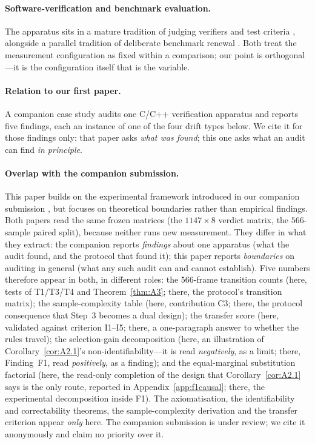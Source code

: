 \documentclass{article}
\begin{document}
\paragraph{Software-verification and benchmark evaluation.} The apparatus sits in a mature tradition of
judging verifiers and test criteria \citep{klein2009sel4,leroy2009compcert,jia2011mutation,just2014mutants,
cadar2008klee,cui2024falsenegatives,li2024ubfuzz,beyer2026svcomp}, alongside a parallel tradition of
deliberate benchmark renewal \citep{kiela2021dynabench,white2024livebench,wang2024benchmarkevolving}. Both
treat the measurement configuration as fixed within a comparison; our point is orthogonal---it is the
configuration itself that is the variable.

\paragraph{Relation to our first paper.} A companion case study \citep{queyi2027caliber} audits one C/C++
verification apparatus and reports five findings, each an instance of one of the four drift types below. We
cite it for those findings only: that paper asks \emph{what was found}; this one asks what an audit can find
\emph{in principle}.

\paragraph{Overlap with the companion submission.} This paper builds on the experimental framework introduced
in our companion submission \citep{queyi2027caliber}, but focuses on theoretical boundaries rather than
empirical findings. Both papers read the same frozen matrices
(the $1147\times8$ verdict matrix, the $566$-sample paired split), because neither runs new measurement.
They differ in what they extract: the companion reports
\emph{findings} about one apparatus (what the audit found, and the protocol that found it);
this paper reports \emph{boundaries} on auditing in general (what any such audit can and
cannot establish). Five numbers therefore appear in both, in different roles: the $566$-frame transition
counts (here, tests of T1/T3/T4 and Theorem~\ref{thm:A3}; there, the protocol's transition matrix);
the sample-complexity table (here, contribution C3; there, the protocol consequence that Step~3
becomes a dual design); the transfer score (here, validated against criterion I1--I5; there, a
one-paragraph answer to whether the rules travel); the selection-gain decomposition
(here, an illustration of Corollary~\ref{cor:A2.1}'s non-identifiability---it is read
\emph{negatively}, as a limit; there, Finding~F1, read \emph{positively}, as a finding); and the
equal-marginal substitution factorial (here, the read-only completion of the design that
Corollary~\ref{cor:A2.1} says is the only route, reported in Appendix~\ref{app:f1causal}; there, the
experimental decomposition inside F1). The
axiomatisation, the identifiability and correctability theorems, the sample-complexity derivation and
the transfer criterion appear \emph{only} here. The companion submission is under review; we cite it
anonymously and claim no priority over it.
\end{document}
